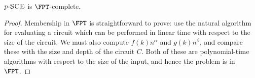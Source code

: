 \documentclass{article}
\newcommand{\dash}{\textnormal{-}}
\newcommand{\pSCE}{p \dash \textsc{SCE}}
\begin{document}
\begin{theorem}\label{thm:psce}
  $\pSCE$ is $\FPT$-complete.
\end{theorem}
\begin{proof}
  Membership in $\FPT$ is straightforward to prove: use the natural algorithm for evaluating a circuit which can be performed in linear time with respect to the size of the circuit.
  We must also compute $f(k) n^\alpha$ and $g(k) n^\beta$, and compare these with the size and depth of the circuit $C$.
  Both of these are polynomial-time algorithms with respect to the size of the input, and hence the problem is in $\FPT$.




\end{proof}
\end{document}

